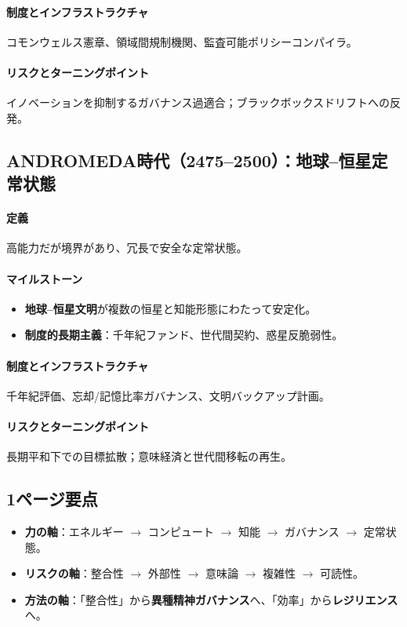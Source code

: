 \documentclass[11pt]{article}
\begin{document}
\paragraph{制度とインフラストラクチャ} コモンウェルス憲章、領域間規制機関、監査可能ポリシーコンパイラ。

\paragraph{リスクとターニングポイント} イノベーションを抑制するガバナンス過適合；ブラックボックスドリフトへの反発。

\subsection{ANDROMEDA時代（2475–2500）：地球–恒星定常状態}
\paragraph{定義} 高能力だが境界があり、冗長で安全な定常状態。

\paragraph{マイルストーン}
\begin{itemize}[noitemsep]
  \item \textbf{地球–恒星文明}が複数の恒星と知能形態にわたって安定化。
  \item \textbf{制度的長期主義}：千年紀ファンド、世代間契約、惑星反脆弱性。
\end{itemize}

\paragraph{制度とインフラストラクチャ} 千年紀評価、忘却/記憶比率ガバナンス、文明バックアップ計画。

\paragraph{リスクとターニングポイント} 長期平和下での目標拡散；意味経済と世代間移転の再生。

\subsection{1ページ要点}
\begin{itemize}[noitemsep]
  \item \textbf{力の軸}：エネルギー $\rightarrow$ コンピュート $\rightarrow$ 知能 $\rightarrow$ ガバナンス $\rightarrow$ 定常状態。
  \item \textbf{リスクの軸}：整合性 $\rightarrow$ 外部性 $\rightarrow$ 意味論 $\rightarrow$ 複雑性 $\rightarrow$ 可読性。
  \item \textbf{方法の軸}：「整合性」から\textbf{異種精神ガバナンス}へ、「効率」から\textbf{レジリエンス}へ。
\end{itemize}
\end{document}
